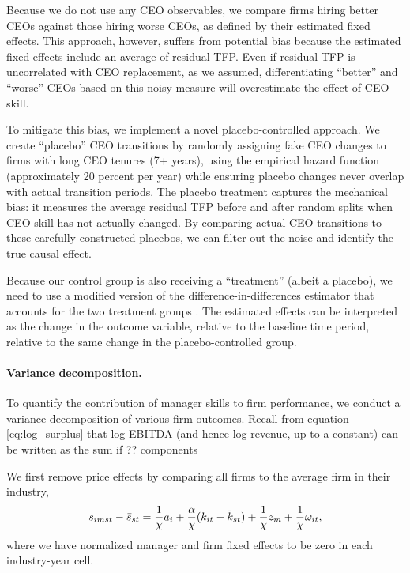 \documentclass[11pt,a4paper]{article}
\begin{document}
Because we do not use any CEO observables, we compare firms hiring better CEOs against those hiring worse CEOs, as defined by their estimated fixed effects. This approach, however, suffers from potential bias because the estimated fixed effects include an average of residual TFP. Even if residual TFP is uncorrelated with CEO replacement, as we assumed, differentiating ``better'' and ``worse'' CEOs based on this noisy measure will overestimate the effect of CEO skill.

To mitigate this bias, we implement a novel placebo-controlled approach. We create ``placebo'' CEO transitions by randomly assigning fake CEO changes to firms with long CEO tenures (7+ years), using the empirical hazard function (approximately 20 percent per year) while ensuring placebo changes never overlap with actual transition periods. The placebo treatment captures the mechanical bias: it measures the average residual TFP before and after random splits when CEO skill has not actually changed. By comparing actual CEO transitions to these carefully constructed placebos, we can filter out the noise and identify the true causal effect. 

Because our control group is also receiving a ``treatment'' (albeit a placebo), we need to use a modified version of the difference-in-differences estimator \citep{Callaway2021JoLE} that accounts for the two treatment groups \citep{Koren2023expat,Koren2024xt2treatments}. The estimated effects can be interpreted as the change in the outcome variable, relative to the baseline time period, relative to the same change in the placebo-controlled group.



\paragraph{Variance decomposition.} To quantify the contribution of manager skills to firm performance, we conduct a variance decomposition of various firm outcomes. Recall from equation \eqref{eq:log_surplus} that log EBITDA (and hence log revenue, up to a constant) can be written as the sum if ?? components

We first remove price effects by comparing all firms to the average firm in their industry,
\begin{equation}
s_{imst} - \Bar s_{st} = \frac1\chi a_i + \frac\alpha\chi (k_{it} - \Bar k_{st}) + \frac1\chi {z}_{m}+ \frac1\chi{\omega}_{it},
\end{equation}
where we have normalized manager and firm fixed effects to be zero in each industry-year cell.
\end{document}
